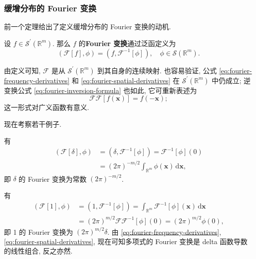 \subsubsection{缓增分布的 Fourier 变换}\label{subsec:tempered-fourier-transform}

前一个定理给出了定义缓增分布的 Fourier 变换的动机.

\begin{Definition}
\label{def:tempered-fourier-transform}
设 $f\in\mathcal{S}^{\prime}(\mathbb{R}^m)$. 那么 $f$ 的\textbf{Fourier 变换}通过泛函定义为
\begin{equation}\label{eq:tempered-distribution-fourier-definition}
(\mathcal{F}[f],\phi)=(f,\mathcal{F}^{-1}[\phi]),\quad\phi\in\mathcal{S}(\mathbb{R}^m).
\end{equation}

\end{Definition}

由定义可知, $\mathcal{F}$ 是从 $\mathcal{S}^{\prime}(\mathbb{R}^m)$ 到其自身的连续映射. 也容易验证, 公式 \eqref{eq:fourier-frequency-derivatives} 和 \eqref{eq:fourier-spatial-derivatives} 在 $\mathcal{S}^{\prime}(\mathbb{R}^m)$ 中仍成立; 逆变换公式 \eqref{eq:fourier-inversion-formula} 也如此, 它可重新表述为
\begin{equation}\label{eq:fourier-transform-twice-reflection}
\mathcal{F}\mathcal{F}[f(\bm{x})]=f(-\bm{x});
\end{equation}
这一形式对广义函数有意义.

现在考察若干例子.

\begin{Example}
\label{ex:fourier-delta}
有
\begin{equation}\label{eq:fourier-transform-delta-pairing}
\begin{aligned}
(\mathcal{F}[\delta],\phi)&=(\delta,\mathcal{F}^{-1}[\phi])=\mathcal{F}^{-1}[\phi](0)\\
&=(2\pi)^{-m/2}\int_{\mathbb{R}^m}\phi(\bm{x})\,\mathrm{d}\bm{x},
\end{aligned}
\end{equation}
即 $\delta$ 的 Fourier 变换为常数 $(2\pi)^{-m/2}$.
\end{Example}

\begin{Example}
\label{ex:fourier-constant}
有
\begin{equation}\label{eq:fourier-transform-constant-pairing}
\begin{aligned}
(\mathcal{F}[1],\phi)&=(1,\mathcal{F}^{-1}[\phi])=\int_{\mathbb{R}^m}\mathcal{F}^{-1}[\phi](\bm{x})\,\mathrm{d}\bm{x}\\
&=(2\pi)^{m/2}\mathcal{F}\mathcal{F}^{-1}[\phi](0)=(2\pi)^{m/2}\phi(0),
\end{aligned}
\end{equation}
即 1 的 Fourier 变换为 $(2\pi)^{m/2}\delta$. 由 \eqref{eq:fourier-frequency-derivatives}, \eqref{eq:fourier-spatial-derivatives}, 现在可知多项式的 Fourier 变换是 delta 函数导数的线性组合, 反之亦然.
\end{Example}

